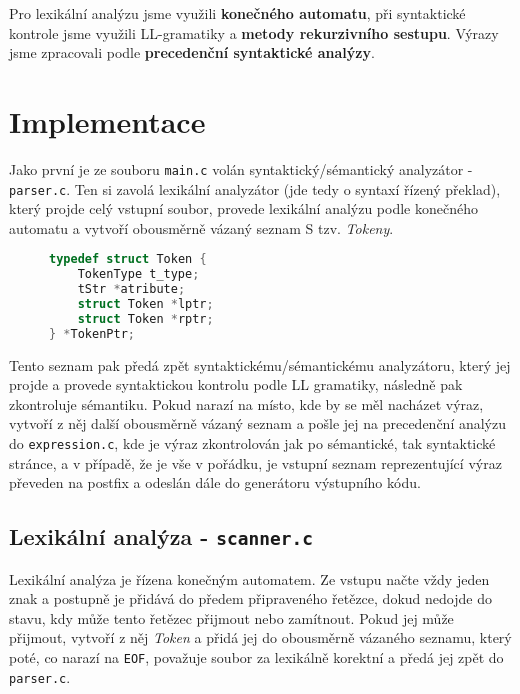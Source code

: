 \documentclass[czech,a4paper,12pt]{article}[]
\begin{document}
\smallskip
Pro lexikální analýzu jsme využili \textbf{konečného automatu}, při syntaktické kontrole jsme využili LL-gramatiky a \textbf{metody rekurzivního sestupu}. Výrazy jsme zpracovali podle \textbf{precedenční syntaktické analýzy}.


\section{Implementace}
Jako první je ze souboru \texttt{main.c} volán syntaktický/sémantický analyzátor - \texttt{parser.c}. Ten si zavolá lexikální analyzátor (jde tedy o syntaxí řízený překlad), který projde celý vstupní soubor, provede lexikální analýzu podle konečného automatu a vytvoří obousměrně vázaný seznam S tzv. \emph{Tokeny}. 

\begin{figure}[h!]
    \begin{lstlisting}[language=C, caption={Implementace struktury tokenu}, captionpos=b]
typedef struct Token {
    TokenType t_type;
    tStr *atribute;
    struct Token *lptr;
    struct Token *rptr;
} *TokenPtr;
    \end{lstlisting}
\label{tokenCode}
\end{figure}

Tento seznam pak předá zpět syntaktickému/sémantickému analyzátoru, který jej projde a provede syntaktickou kontrolu podle LL gramatiky, následně pak zkontroluje sémantiku. Pokud narazí na místo, kde by se měl nacházet výraz, vytvoří z něj další obousměrně vázaný seznam a pošle jej na precedenční analýzu do \texttt{expression.c}, kde je výraz zkontrolován jak po sémantické, tak syntaktické stránce, a v případě, že je vše v pořádku, je vstupní seznam reprezentující výraz převeden na postfix a odeslán dále do generátoru výstupního kódu.

\newpage


\subsection{Lexikální analýza - \texttt{scanner.c}}
Lexikální analýza je řízena konečným automatem. Ze vstupu načte vždy jeden znak a postupně je přidává do předem připraveného řetězce, dokud nedojde do stavu, kdy může tento řetězec přijmout nebo zamítnout. Pokud jej může přijmout, vytvoří z něj \emph{Token} a přidá jej do obousměrně vázaného seznamu, který poté, co narazí na \texttt{EOF}, považuje soubor za lexikálně korektní a předá jej zpět do \texttt{parser.c}.
\end{document}
